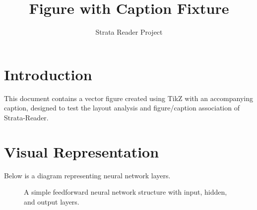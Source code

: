 \documentclass{article}
\title{Figure with Caption Fixture}
\author{Strata Reader Project}
\begin{document}
\maketitle

\section{Introduction}
This document contains a vector figure created using TikZ with an accompanying caption, designed to test the layout analysis and figure/caption association of Strata-Reader.

\section{Visual Representation}
Below is a diagram representing neural network layers.

\begin{figure}[h]
\centering
{}
\caption{A simple feedforward neural network structure with input, hidden, and output layers.}
\label{fig:nn}
\end{figure}
\end{document}
